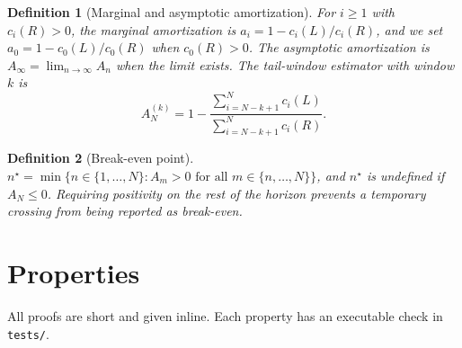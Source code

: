 \documentclass[11pt]{article}
\newtheorem{definition}{Definition}
\theoremstyle{remark}
\begin{document}
\begin{definition}[Marginal and asymptotic amortization]\label{def:marg}
For $i\ge 1$ with $c_i(R)>0$, the marginal amortization is $a_i = 1 - c_i(L)/c_i(R)$, and we set $a_0 = 1-c_0(L)/c_0(R)$ when $c_0(R)>0$.
The asymptotic amortization is $A_\infty = \lim_{n\to\infty} A_n$ when the limit exists.
The tail-window estimator with window $k$ is
\[
A^{(k)}_N = 1-\frac{\sum_{i=N-k+1}^{N} c_i(L)}{\sum_{i=N-k+1}^{N} c_i(R)}.
\]
\end{definition}

\begin{definition}[Break-even point]\label{def:be}
$n^\star = \min\{n\in\{1,\dots,N\}: A_m>0 \text{ for all } m\in\{n,\dots,N\}\}$, and $n^\star$ is undefined if $A_N\le 0$.
Requiring positivity on the rest of the horizon prevents a temporary crossing from being reported as break-even.
\end{definition}

\section{Properties}\label{sec:props}

All proofs are short and given inline. Each property has an executable check in \texttt{tests/}.
\end{document}
